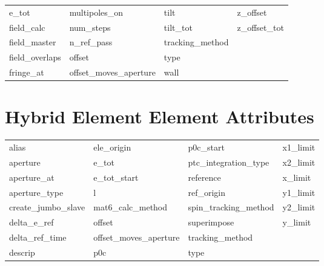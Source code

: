 \begin{tabular}{llll}
e_tot                       & multipoles_on               & tilt                        & z_offset                    \\
field_calc                  & num_steps                   & tilt_tot                    & z_offset_tot                \\
field_master                & n_ref_pass                  & tracking_method             &                             \\
field_overlaps              & offset                      & type                        &                             \\
fringe_at                   & offset_moves_aperture       & wall                        &                             \\
 \bottomrule
 \end{tabular}
 \vfill
 
 \section{Hybrid Element Element Attributes}
 \label{s:list.hybrid}
 
 \begin{tabular}{llll} \toprule
alias                       & ele_origin                  & p0c_start                   & x1_limit                    \\
aperture                    & e_tot                       & ptc_integration_type        & x2_limit                    \\
aperture_at                 & e_tot_start                 & reference                   & x_limit                     \\
aperture_type               & l                           & ref_origin                  & y1_limit                    \\
create_jumbo_slave          & mat6_calc_method            & spin_tracking_method        & y2_limit                    \\
delta_e_ref                 & offset                      & superimpose                 & y_limit                     \\
delta_ref_time              & offset_moves_aperture       & tracking_method             &                             \\
descrip                     & p0c                         & type                        &                             \\
 \bottomrule
 \end{tabular}
 \vfill
 
